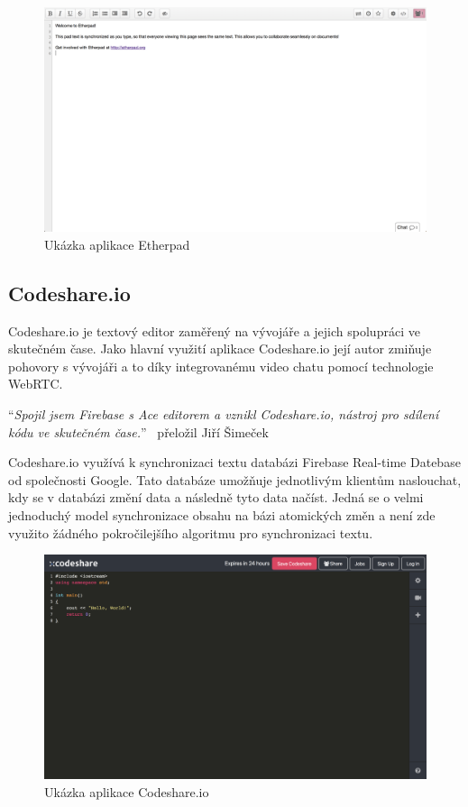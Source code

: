 \begin{figure}[ht]
    \centering
    \includegraphics[width=\textwidth]{partials/analyza/etherpad}
    \caption{Ukázka aplikace Etherpad}\label{fig:etherpad}
\end{figure}

\subsection{Codeshare.io}\label{subsec:codeshare.io}

Codeshare.io je textový editor zaměřený na vývojáře a jejich spolupráci ve skutečném čase.
Jako hlavní využití aplikace Codeshare.io její autor zmiňuje pohovory s vývojáři a to díky integrovanému video chatu pomocí technologie \gls{WebRTC}.~\cite{codeshare:home}

\enquote{\textit{Spojil jsem Firebase s Ace editorem a vznikl Codeshare.io, nástroj pro sdílení kódu ve skutečném čase.}}~\cite{codeshare:created} přeložil Jiří Šimeček

Codeshare.io využívá k synchronizaci textu databázi Firebase Real-time Datebase od společnosti Google.
Tato databáze umožňuje jednotlivým klientům naslouchat, kdy se v databázi změní data a následně tyto data načíst.
Jedná se o velmi jednoduchý model synchronizace obsahu na bázi atomických změn a není zde využito žádného pokročilejšího algoritmu pro synchronizaci textu.~\cite{codeshare:created}

\begin{figure}[ht]
    \centering
    \includegraphics[width=\textwidth]{partials/analyza/codeshare}
    \caption{Ukázka aplikace Codeshare.io}\label{fig:codeshare}
\end{figure}

